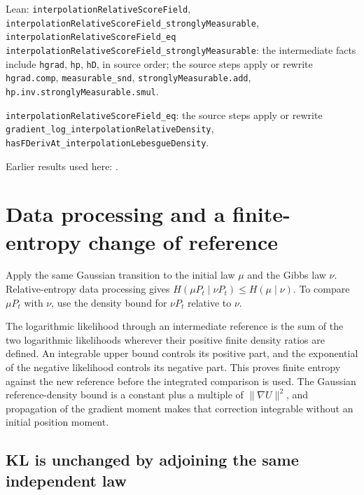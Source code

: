 \documentclass[11pt,a4paper]{report}
\begin{document}
\begin{leanbox}{Lean: \texttt{interpolationRelativeScoreField}, \texttt{interpolationRelativeScoreField\_\allowbreak{}stronglyMeasurable}, \texttt{interpolationRelativeScoreField\_\allowbreak{}eq}}
\texttt{interpolation\allowbreak{}Relative\allowbreak{}Score\allowbreak{}Field\_\allowbreak{}strongly\allowbreak{}Measurable}: the intermediate facts include \texttt{hgrad}, \texttt{hp}, \texttt{h\allowbreak{}D}, in source order; the source steps apply or rewrite \texttt{hgrad.\allowbreak{}comp}, \texttt{measurable\_\allowbreak{}snd}, \texttt{strongly\allowbreak{}Measurable.\allowbreak{}add}, \texttt{hp.\allowbreak{}inv.\allowbreak{}strongly\allowbreak{}Measurable.\allowbreak{}smul}.



\texttt{interpolation\allowbreak{}Relative\allowbreak{}Score\allowbreak{}Field\_\allowbreak{}eq}: the source steps apply or rewrite \texttt{gradient\_\allowbreak{}log\_\allowbreak{}interpolation\allowbreak{}Relative\allowbreak{}Density}, \texttt{has\allowbreak{}FDeriv\allowbreak{}At\_\allowbreak{}interpolation\allowbreak{}Lebesgue\allowbreak{}Density}.
\end{leanbox}


Earlier results used here: \cite[Section~3.26.3]{LangevinLean2026ULASC}.
\section{\texorpdfstring{Data processing and a finite-entropy change of reference}{Data processing and a finite-entropy change of reference}}
\label{proof-module-UnadjustedLangevin-LSI-EntropyEndpoint-lean}


Apply the same Gaussian transition to the initial law \(\mu\) and the Gibbs law \(\nu\). Relative-entropy data processing gives \(H(\mu P_t\mid\nu P_t)\le H(\mu\mid\nu)\). To compare \(\mu P_t\) with \(\nu\), use the density bound for \(\nu P_t\) relative to \(\nu\).



The logarithmic likelihood through an intermediate reference is the sum of the two logarithmic likelihoods wherever their positive finite density ratios are defined. An integrable upper bound controls its positive part, and the exponential of the negative likelihood controls its negative part. This proves finite entropy against the new reference before the integrated comparison is used. The Gaussian reference-density bound is a constant plus a multiple of \(\|\nabla U\|^2\), and propagation of the gradient moment makes that correction integrable without an initial position moment.

\subsection{\texorpdfstring{KL is unchanged by adjoining the same independent law}{KL is unchanged by adjoining the same independent law}}
\label{report-step-UnadjustedLangevin-LSI-EntropyEndpoint-lean-1}
\end{document}
